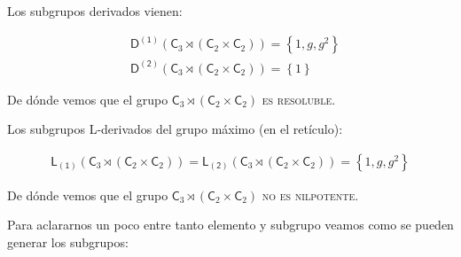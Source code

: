 \documentclass[12pt,a4paper,fleqn,spanish,final,openright]{extbook}
\theoremstyle{definition}
\theoremstyle{remark}
\begin{document}
Los subgrupos derivados vienen:

\begin{align*}
&\mathsf{D^{(1)}}{\left({\mathsf{C}_{3}}\rtimes({\mathsf{C}_{2}}\times{\mathsf{C}_{2}})\right)} = {\left\lbrace{1,g,g^2}\right\rbrace}\\
&\mathsf{D^{(2)}}{\left({\mathsf{C}_{3}}\rtimes({\mathsf{C}_{2}}\times{\mathsf{C}_{2}})\right)} = {\left\lbrace{1}\right\rbrace}
\end{align*}

De dónde vemos que el grupo ${\mathsf{C}_{3}}\rtimes({\mathsf{C}_{2}}\times{\mathsf{C}_{2}})$ \textsc{ es resoluble}.

Los subgrupos L-derivados del grupo máximo (en el retículo):

\begin{align*}
\mathsf{L_{(1)}}{\left({\mathsf{C}_{3}}\rtimes({\mathsf{C}_{2}}\times{\mathsf{C}_{2}})
\right)} = \mathsf{L_{(2)}}{\left({\mathsf{C}_{3}}\rtimes({\mathsf{C}_{2}}\times{\mathsf{C}_{2}})
\right)} = {\left\lbrace{1,g,g^2}\right\rbrace}
\end{align*}

De dónde vemos que el grupo 
${\mathsf{C}_{3}}\rtimes({\mathsf{C}_{2}}\times{\mathsf{C}_{2}})$ \textsc{no es nilpotente}.

Para aclararnos un poco entre tanto elemento y subgrupo veamos como se pueden generar los 
subgrupos:
\end{document}
